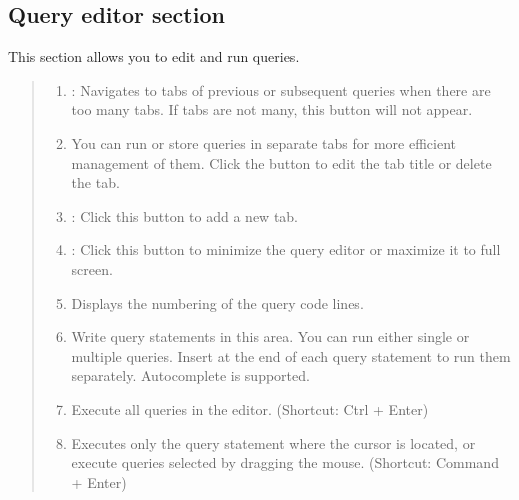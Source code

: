 \documentclass[letterpaper,10pt,english]{sphinxmanual}
\begin{document}
\subsection{Query editor section}
\label{\detokenize{discovery/part06/06_03-use_a_workbench:workbench-use-3}}\label{\detokenize{discovery/part06/06_03-use_a_workbench:id4}}
This section allows you to edit and run queries.
\begin{quote}

\begin{figure}[H]
\centering

\noindent{}
\end{figure}
\begin{enumerate}
\def\theenumi{\arabic{enumi}}
\def\labelenumi{\theenumi .}
\makeatletter\def\p@enumii{\p@enumi \theenumi .}\makeatother
\item {} 
 : Navigates to tabs of previous or subsequent queries when there are too many tabs. If tabs are not many, this button will not appear.

\item {} 
 You can run or store queries in separate tabs for more efficient management of them. Click the  button to edit the tab title or delete the tab.

\item {} 
 : Click this button to add a new tab.

\item {} 
 : Click this button to minimize the query editor or maximize it to full screen.

\item {} 
 Displays the numbering of the query code lines.

\item {} 
 Write query statements in this area. You can run either single or multiple queries. Insert \sphinxcode{\sphinxupquote{;}} at the end of each query statement to run them separately. Autocomplete is supported.

\item {} 
 Execute all queries in the editor. (Shortcut: Ctrl + Enter)

\item {} 
 Executes only the query statement where the cursor is located, or execute queries selected by dragging the mouse. (Shortcut: Command + Enter)


\end{enumerate}
\end{quote}
\end{document}
